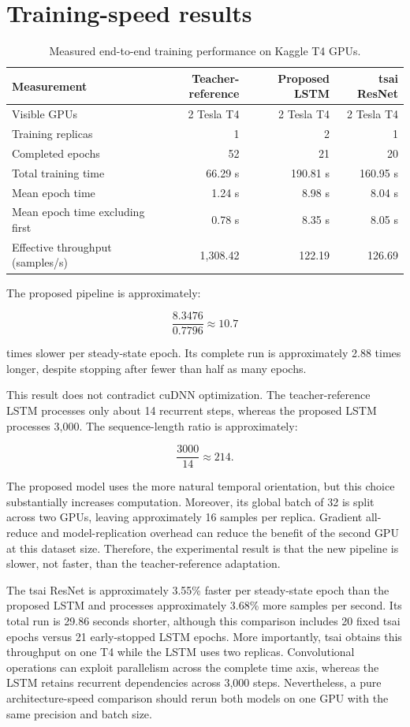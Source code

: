 \documentclass[11pt,a4paper]{article}
\begin{document}
\section{Training-speed results}

\begin{table}[htbp]
\centering
\caption{Measured end-to-end training performance on Kaggle T4 GPUs.}
\begin{tabular}{@{}lrrr@{}}
\toprule
\textbf{Measurement} & \textbf{Teacher-reference} &
\textbf{Proposed LSTM} & \textbf{tsai ResNet} \\
\midrule
Visible GPUs & 2 Tesla T4 & 2 Tesla T4 & 2 Tesla T4 \\
Training replicas & 1 & 2 & 1 \\
Completed epochs & 52 & 21 & 20 \\
Total training time & 66.29 s & 190.81 s & 160.95 s \\
Mean epoch time & 1.24 s & 8.98 s & 8.04 s \\
Mean epoch time excluding first & 0.78 s & 8.35 s & 8.05 s \\
Effective throughput (samples/s) & 1,308.42 & 122.19 & 126.69 \\
\bottomrule
\end{tabular}
\end{table}

The proposed pipeline is approximately:

\[
\frac{8.3476}{0.7796} \approx 10.7
\]

times slower per steady-state epoch. Its complete run is approximately 2.88
times longer, despite stopping after fewer than half as many epochs.

This result does not contradict cuDNN optimization. The teacher-reference LSTM
processes only about 14 recurrent steps, whereas the proposed LSTM processes
3,000. The sequence-length ratio is approximately:

\[
\frac{3000}{14} \approx 214.
\]

The proposed model uses the more natural temporal orientation, but this choice
substantially increases computation. Moreover, its global batch of 32 is split
across two GPUs, leaving approximately 16 samples per replica. Gradient
all-reduce and model-replication overhead can reduce the benefit of the second
GPU at this dataset size. Therefore, the experimental result is that the new
pipeline is slower, not faster, than the teacher-reference adaptation.

The tsai ResNet is approximately 3.55\% faster per steady-state epoch than the
proposed LSTM and processes approximately 3.68\% more samples per second. Its
total run is 29.86 seconds shorter, although this comparison includes 20 fixed
tsai epochs versus 21 early-stopped LSTM epochs. More importantly, tsai obtains
this throughput on one T4 while the LSTM uses two replicas. Convolutional
operations can exploit parallelism across the complete time axis, whereas the
LSTM retains recurrent dependencies across 3,000 steps. Nevertheless, a pure
architecture-speed comparison should rerun both models on one GPU with the
same precision and batch size.
\end{document}
